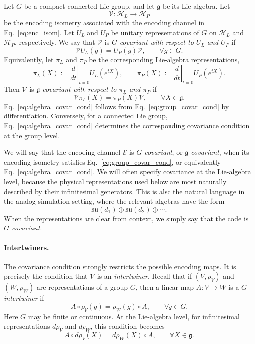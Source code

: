 \documentclass[10pt,twocolumn,superscriptaddress,aps,amsmath,amssymb,citeautoscript,floatfix,prx]{revtex4-2}
\newcounter{alg}
\theoremstyle{plain}
\theoremstyle{plain}
\theoremstyle{plain}
\theoremstyle{plain}
\theoremstyle{plain}
\theoremstyle{plain}
\theoremstyle{plain}
\theoremstyle{definition}
\theoremstyle{plain}
\begin{document}
Let $G$ be a compact connected Lie group, and let $\mathfrak g$ be its Lie algebra. Let
$$
\mathcal{V}:\mathcal H_L\to\mathcal H_P
$$
be the encoding isometry associated with the encoding channel in Eq.~\eqref{eq:enc_isom}. 
Let $U_L$ and $U_P$ be unitary representations of $G$ on $\mathcal H_L$ and $\mathcal H_P$, respectively. 
We say that $\mathcal{V}$ is $G$-\textit{covariant with respect to $U_L$ and $U_P$} if
\begin{equation}\label{eq:group_covar_cond}
\mathcal{V}U_L(g)
=
U_P(g)\mathcal{V},
\qquad
\forall g\in G .
\end{equation}
Equivalently, let $\pi_L$ and $\pi_P$ be the corresponding Lie-algebra representations,
$$
\pi_L(X)
:=
\left.\frac{d}{dt}\right|_{t=0}
U_L(e^{tX}),
\qquad
\pi_P(X)
:=
\left.\frac{d}{dt}\right|_{t=0}
U_P(e^{tX}).
$$
Then $\mathcal{V}$ is \textit{$\mathfrak g$-covariant with respect to $\pi_L$ and $\pi_P$} if
\begin{equation}\label{eq:algebra_covar_cond}
\mathcal{V}\pi_L(X)
=
\pi_P(X)\mathcal{V},
\qquad
\forall X\in\mathfrak g .
\end{equation}
Eq.~\eqref{eq:algebra_covar_cond} follows from Eq.~\eqref{eq:group_covar_cond} by differentiation. 
Conversely, for a connected Lie group, Eq.~\eqref{eq:algebra_covar_cond} determines the corresponding covariance condition at the group level.

We will say that the encoding channel $\mathcal E$ is \textit{$G$-covariant}, or \textit{$\mathfrak g$-covariant}, 
when its encoding isometry satisfies Eq.~\eqref{eq:group_covar_cond}, or equivalently Eq.~\eqref{eq:algebra_covar_cond}. 
We will often specify covariance at the Lie-algebra level, because the physical representations used below are most naturally described by their infinitesimal generators. 
This is also the natural language in the analog-simulation setting, where the relevant algebras have the form
$$
\mathfrak{su}(d_1)
\oplus
\mathfrak{su}(d_2)
\oplus
\cdots .
$$
When the representations are clear from context, we simply say that the code is \textit{$G$-covariant}.

\paragraph{Intertwiners.}

The covariance condition strongly restricts the possible encoding maps. It is precisely the condition that $\mathcal{V}$ is an \textit{intertwiner}. 
Recall that if $(V,\rho_{V})$ and $(W,\rho_{W})$ are representations of a group $G$, then a linear map $A:V\to W$ is a \textit{$G$-intertwiner} if
\begin{equation}\label{eq:intertwiner_def}
A\circ\rho_{V}(g)
=
\rho_{W}(g)\circ A,
\qquad
\forall g\in G .
\end{equation}
Here $G$ may be finite or continuous. At the Lie-algebra level, for infinitesimal representations $d\rho_{V}$ and $d\rho_{W}$, this condition becomes
$$
A\circ d\rho_{V}(X)
=
d\rho_{W}(X)\circ A,
\qquad
\forall X\in\mathfrak g .
$$
\end{document}
